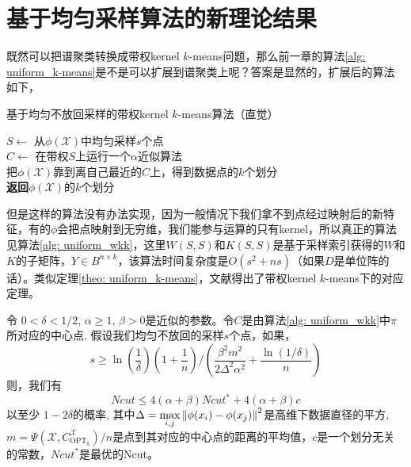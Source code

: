 \section{基于均匀采样算法的新理论结果}
既然可以把谱聚类转换成带权kernel $k$-means问题，那么前一章的算法\ref{alg: uniform_k-means}是不是可以扩展到谱聚类上呢？答案是显然的，扩展后的算法如下，
\begin{algorithm}
    \caption{基于均匀不放回采样的带权kernel $k$-means算法（直觉）}
    $S \gets$ 从$\phi(\mathcal{X})$中均匀采样$s$个点\\
    $C \gets$ 在带权$S$上运行一个$\alpha$近似算法\\
    把$\phi(\mathcal{X})$靠到离自己最近的$C$上，得到数据点的$k$个划分\\
    \textbf{返回}$\phi(\mathcal{X})$的$k$个划分
\end{algorithm}
但是这样的算法没有办法实现，因为一般情况下我们拿不到点经过映射后的新特征，有的$\phi$会把点映射到无穷维，我们能参与运算的只有kernel，所以真正的算法见算法\ref{alg: uniform_wkk}，这里$W(S,S)$和$K(S,S)$是基于采样索引获得的$W$和$K$的子矩阵，$Y\in B^{n\times k}$，该算法时间复杂度是$O(s^2+ns)$（如果$D$是单位阵的话）。类似定理\ref{theo: uniform_k-means}，文献\cite{Mohan:2017:BNA:3172077.3172235}得出了带权kernel $k$-means下的对应定理。
\begin{theorem}[均匀不放回采样的谱聚类解的质量]
    \label{theo: uniform_wkk}
    令 $0 < \delta <1/2$, $\alpha \geq 1$, $\beta >0$是近似的参数。令$C$是由算法\ref{alg: uniform_wkk}中$\pi$所对应的中心点. 假设我们均匀不放回的采样$s$个点，如果，
    \begin{equation*}
    s \geq \ln(\frac{1}{\delta})(1+\frac{1}{n})/(\frac{\beta^2 m^2}{2\Delta^2 \alpha^2}+\frac{\ln(1/\delta)}{n})
    \end{equation*}
    则，我们有
    \begin{equation*}
    Ncut \leq 4(\alpha + \beta) Ncut^* + 4(\alpha + \beta)c
    \end{equation*}
    以至少 $1-2\delta$的概率, 其中$\Delta = \max\limits_{i,j}\left\lVert\phi(x_i) - \phi(x_j)\right\rVert^2$是高维下数据直径的平方, $m = \Psi(\mathcal{X},C_{\text{OPT}_k}^{\mathcal{X}})/n$是点到其对应的中心点的距离的平均值，$c$是一个划分无关的常数，$Ncut^*$是最优的Ncut。
\end{theorem}
